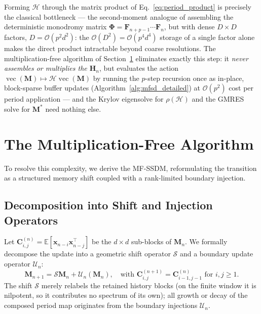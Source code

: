 \documentclass[preprint,12pt]{elsarticle}
\begin{document}
Forming $\mathcal{H}$ through the matrix product of Eq.~\eqref{eq:period_product} is precisely the classical bottleneck --- the second-moment analogue of assembling the deterministic monodromy matrix $\boldsymbol{\Phi} = \mathbf{F}_{n+p-1}\cdots\mathbf{F}_n$, but with dense $D\times D$ factors, $D=\mathcal{O}(p^2 d^2)$: the $\mathcal{O}(D^2)=\mathcal{O}(p^4 d^4)$ storage of a single factor alone makes the direct product intractable beyond coarse resolutions. The multiplication-free algorithm of Section~\ref{sec:mf_algo} eliminates exactly this step: it \emph{never assembles or multiplies the $\mathbf{H}_n$}, but evaluates the action $\operatorname{vec}(\mathbf{M})\mapsto\mathcal{H}\operatorname{vec}(\mathbf{M})$ by running the $p$-step recursion once as in-place, block-sparse buffer updates (Algorithm~\ref{alg:mfsd_detailed}) at $\mathcal{O}(p^2)$ cost per period application --- and the Krylov eigensolve for $\rho(\mathcal{H})$ and the GMRES solve for $\mathbf{M}^*$ need nothing else.

\section{The Multiplication-Free Algorithm}
\label{sec:mf_algo}

To resolve this complexity, we derive the MF-SSDM, reformulating the transition as a structured memory shift coupled with a rank-limited boundary injection.

\subsection{Decomposition into Shift and Injection Operators}
Let $\mathbf{C}_{i,j}^{(n)} = \mathbb{E}[\mathbf{x}_{n-i} \mathbf{x}_{n-j}^\top]$ be the $d \times d$ sub-blocks of $\mathbf{M}_n$. We formally decompose the update into a geometric shift operator $\mathcal{S}$ and a boundary update operator $\mathcal{U}_n$:
\begin{equation}
\mathbf{M}_{n+1} = \mathcal{S} \mathbf{M}_n + \mathcal{U}_n(\mathbf{M}_n), \quad \text{with } \mathbf{C}_{i,j}^{(n+1)} = \mathbf{C}_{i-1,j-1}^{(n)} \text{ for } i,j \ge 1.
\end{equation}
The shift $\mathcal{S}$ merely relabels the retained history blocks (on the finite window it is nilpotent, so it contributes no spectrum of its own); all growth or decay of the composed period map originates from the boundary injections $\mathcal{U}_n$.
\end{document}
